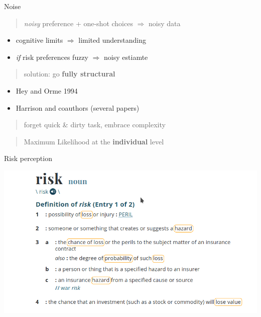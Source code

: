 \documentclass[
  ignorenonframetext,
]{beamer}
\providecommand{\tightlist}{%
  \setlength{\itemsep}{0pt}\setlength{\parskip}{0pt}}
\begin{document}
\begin{frame}{Noise}
\protect\hypertarget{noise}{}

\begin{quote}
\emph{noisy} preference + one-shot choices \(\Rightarrow\) noisy data
\end{quote}

\begin{itemize}
\item
  cognitive limits \(\Rightarrow\) limited understanding
\item
  \emph{if} risk preferences fuzzy \(\Rightarrow\) noisy estiamte
\end{itemize}

\begin{quote}
solution: go \textbf{fully structural}
\end{quote}

\begin{itemize}
\tightlist
\item
  Hey and Orme 1994
\item
  Harrison and coauthors (several papers)
\end{itemize}

\begin{quote}
forget quick \& dirty task, embrace complexity
\end{quote}

\begin{quote}
Maximum Likelihood at the \textbf{individual} level
\end{quote}

\end{frame}

\begin{frame}{Risk perception}
\protect\hypertarget{risk-perception}{}

\includegraphics[width=7.29167in,height=\textheight]{risk_def.png}

\end{frame}
\end{document}
